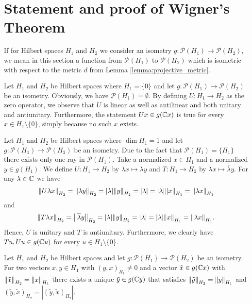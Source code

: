 \section{Statement and proof of Wigner's Theorem}

If for Hilbert spaces $H_1$ and $H_2$ we consider an isometry $g: \mathcal{P}(H_1) \to \mathcal{P}(H_2)$, we mean in this section a function from $\mathcal{P}(H_1)$ to $\mathcal{P}(H_2)$ which is isometric with respect to the metric $d$ from Lemma \ref{lemma:projective_metric}.


\begin{example} \label{example:zerodim}
	Let $H_1$ and $H_2$ be Hilbert spaces where $H_1 = \{0\}$ and let $g: \mathcal{P}(H_1) \to \mathcal{P}(H_2)$ be an isometry. Obviously, we have $\mathcal{P}(H_1) = \emptyset$. By defining $U: H_1 \to H_2$ as the zero operator, we observe that $U$ is linear as well as antilinear and both unitary and antiunitary. Furthermore, the statement $Ux \in g\pbraces{\C x}$ is true for every $x \in H_1 \setminus \{0\}$, simply because no such $x$ exists.
\end{example}


\begin{example} \label{example:onedim}
	Let $H_1$ and $H_2$ be Hilbert spaces where $\dim H_1 = 1$ and let $g: \mathcal{P}(H_1) \to \mathcal{P}(H_2)$ be an isometry. Due to the fact that $\mathcal{P}(H_1) = \{H_1\}$ there exists only one ray in $\mathcal{P}(H_1)$. Take a normalized $x \in H_1$ and a normalized $y \in g(H_1)$. We define $U: H_1 \to H_2$ by $\lambda x \mapsto \lambda y$ and $T: H_1 \to H_2$ by $\lambda x \mapsto \overline{\lambda} y$. For any $\lambda \in \C$ we have
	\begin{align*}
		\norm[H_2]{U\lambda x} = \norm[H_2]{\lambda y} = \vbraces{\lambda} \norm[H_2]{y} = \vbraces{\lambda} = \vbraces{\lambda} \norm[H_1]{x} = \norm[H_1]{\lambda x}
	\end{align*}
	and 
	\begin{align*}
		\norm[H_2]{T\lambda x} = \norm[H_2]{\overline{\lambda} y} = \vbraces{\lambda} \norm[H_2]{y} = \vbraces{\lambda} = \vbraces{\lambda} \norm[H_1]{x} = \norm[H_1]{\lambda x}.
	\end{align*}
	Hence, $U$ is unitary and $T$ is antiunitary. Furthermore, we clearly have $Tu, Uu \in g\pbraces{\C u}$ for every $u \in H_1 \setminus \{0\}$. 
\end{example}


\begin{lemma} \label{lemma:phase_adjustment_ray}
	Let $H_1$ and $H_2$ be Hilbert spaces and let $g: \mathcal{P}(H_1) \to \mathcal{P}(H_2)$ be an isometry. For two vectors $x,y \in H_1$ with $(y,x)_{H_1} \neq 0$ and a vector $\tilde{x} \in g(\C x)$ with $\norm[H_2]{\tilde{x}} = \norm[H_1]{x}$ there exists a unique $\tilde{y} \in g(\C y)$ that satisfies $\norm[H_2]{\tilde{y}} = \norm[H_1]{y}$ and $(\tilde{y},\tilde{x})_{H_2} = |(\tilde{y},\tilde{x})_{H_2}| $.
\end{lemma}

